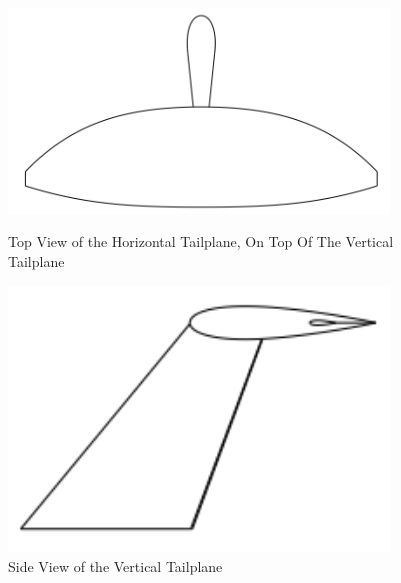 \begin{figure}[H]
    \centering
    \begin{minipage}{0.45\textwidth}
        \centering
        \includegraphics[width=0.9\textwidth]{Aerodynamics/Figures/htail} %
        \caption{Top View of the Horizontal Tailplane, On Top Of The Vertical Tailplane}
        \label{fig:vtail}
    \end{minipage}\hfill
    \begin{minipage}{0.45\textwidth}
        \centering
        \includegraphics[width=0.9\textwidth]{Aerodynamics/Figures/vtail} %
        \caption{Side View of the Vertical Tailplane}
        \label{fig:htail}
    \end{minipage}
\end{figure}







